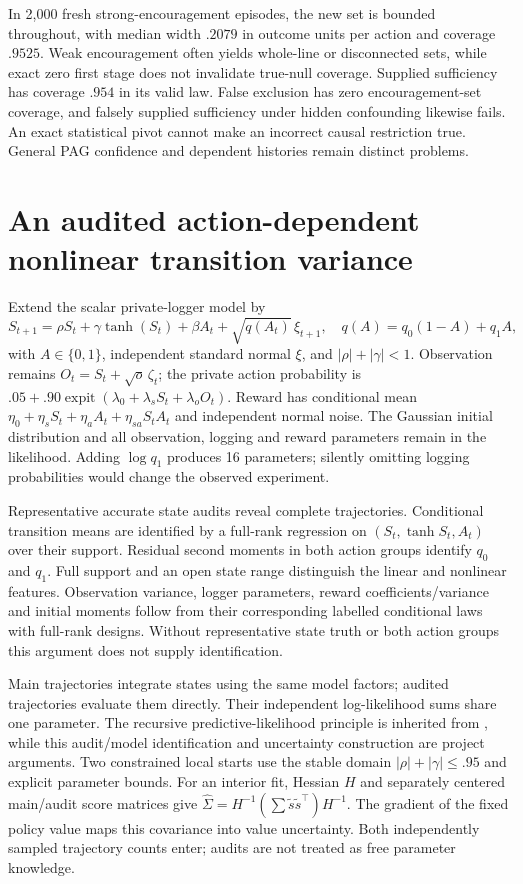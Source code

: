 In 2,000 fresh strong-encouragement episodes, the new set is bounded throughout,
with median width $.2079$ in outcome units per action and coverage $.9525$.
Weak encouragement often yields whole-line or disconnected sets, while exact
zero first stage does not invalidate true-null coverage. Supplied sufficiency
has coverage $.954$ in its valid law. False exclusion has zero encouragement-set
coverage, and falsely supplied sufficiency under hidden confounding likewise
fails. An exact statistical pivot cannot make an incorrect causal restriction
true. General PAG confidence and dependent histories remain distinct problems.

\section{An audited action-dependent nonlinear transition variance}
\label{r8:nonlinear}

Extend the scalar private-logger model by
\[
 S_{t+1}=\rho S_t+\gamma\tanh(S_t)+\beta A_t+\sqrt{q(A_t)}\,\xi_{t+1},
 \quad q(A)=q_0(1-A)+q_1A,
\]
with $A\in\{0,1\}$, independent standard normal $\xi$, and
$|\rho|+|\gamma|<1$. Observation remains $O_t=S_t+\sqrt{o}\,\zeta_t$;
the private action probability is
$.05+.90\operatorname{expit}(\lambda_0+\lambda_sS_t+\lambda_oO_t)$.
Reward has conditional mean
$\eta_0+\eta_sS_t+\eta_aA_t+\eta_{sa}S_tA_t$ and independent normal noise.
The Gaussian initial distribution and all observation, logging and reward
parameters remain in the likelihood. Adding $\log q_1$ produces 16 parameters;
silently omitting logging probabilities would change the observed experiment.

Representative accurate state audits reveal complete trajectories. Conditional
transition means are identified by a full-rank regression on
$(S_t,\tanh S_t,A_t)$ over their support. Residual second moments in both action
groups identify $q_0$ and $q_1$. Full support and an open state range distinguish
the linear and nonlinear features. Observation variance, logger parameters,
reward coefficients/variance and initial moments follow from their corresponding
labelled conditional laws with full-rank designs. Without representative state
truth or both action groups this argument does not supply identification.

Main trajectories integrate states using the same model factors; audited
trajectories evaluate them directly. Their independent log-likelihood sums
share one parameter. The recursive predictive-likelihood principle is inherited
from \citet{sarkka2013}, while this audit/model identification and uncertainty
construction are project arguments. Two constrained local starts use the stable
domain $|\rho|+|\gamma|\leq .95$ and explicit parameter bounds. For an interior
fit, Hessian $H$ and separately centered main/audit score matrices give
$\widehat\Sigma=H^{-1}(\sum\tilde s\tilde s^\top)H^{-1}$.
The gradient of the fixed policy value maps this covariance into value
uncertainty. Both independently sampled trajectory counts enter; audits are
not treated as free parameter knowledge.

